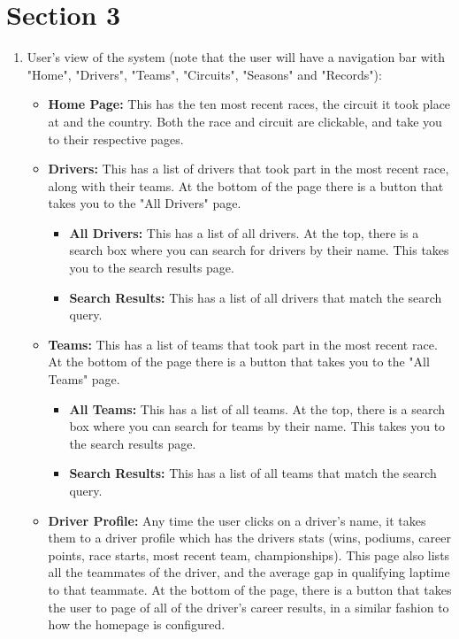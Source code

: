 \documentclass{article}
\begin{document}
\section{Section 3}
\begin{enumerate}
	\item User's view of the system (note that the user will have a navigation bar with "Home", "Drivers", "Teams", "Circuits", "Seasons" and "Records"):
	\begin{itemize}
		\item \textbf{Home Page:} This has the ten most recent races, the circuit it took place at and the country. Both the race and circuit are clickable, and take you to their respective pages.
		\item \textbf{Drivers:} This has a list of drivers that took part in the most recent race, along with their teams. At the bottom of the page there is a button that takes you to the "All Drivers" page.
		\begin{itemize}
			\item \textbf{All Drivers:} This has a list of all drivers. At the top, there is a search box where you can search for drivers by their name. This takes you to the search results page.
			\item \textbf{Search Results:} This has a list of all drivers that match the search query.
		\end{itemize}
		\item \textbf{Teams:} This has a list of teams that took part in the most recent race. At the bottom of the page there is a button that takes you to the "All Teams" page.
		\begin{itemize}
			\item \textbf{All Teams:} This has a list of all teams. At the top, there is a search box where you can search for teams by their name. This takes you to the search results page.
			\item \textbf{Search Results:} This has a list of all teams that match the search query.
		\end{itemize}
		\item \textbf{Driver Profile:} Any time the user clicks on a driver's name, it takes them to a driver profile which has the drivers stats (wins, podiums, career points, race starts, most recent team, championships). This page also lists all the teammates of the driver, and the average gap in qualifying laptime to that teammate. At the bottom of the page, there is a button that takes the user to page of all of the driver's career results, in a similar fashion to how the homepage is configured.

\end{itemize}
\end{enumerate}
\end{document}
